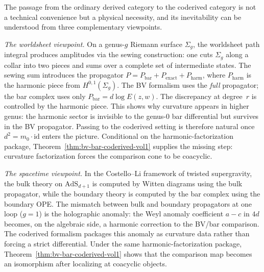 \begin{remark}
\label{rem:bv-bar-coderived-why}
The passage from the ordinary derived category to the coderived
category is not a technical convenience but a physical necessity,
and its inevitability can be understood from three complementary
viewpoints.

\emph{The worldsheet viewpoint.}
On a genus-$g$ Riemann surface $\Sigma_g$, the worldsheet path
integral produces amplitudes via the sewing construction: one cuts
$\Sigma_g$ along a collar into two pieces and sums over a complete
set of intermediate states. The sewing sum introduces the
propagator $P = P_{\mathrm{bar}} + P_{\mathrm{exact}} +
P_{\mathrm{harm}}$, where $P_{\mathrm{harm}}$ is the harmonic
piece from $H^{0,1}(\Sigma_g)$. The BV formalism uses the
\emph{full} propagator; the bar complex uses only
$P_{\mathrm{bar}} = d\log E(z,w)$. The discrepancy at degree~$r$
is controlled by the harmonic piece. This shows why curvature
appears in higher genus: the harmonic sector is invisible to the
genus-$0$ bar differential but survives in the BV propagator.
Passing to the coderived setting is therefore natural once
$d^2 = m_0 \cdot \mathrm{id}$ enters the picture. Conditional on the
harmonic-factorization package, Theorem~\ref{thm:bv-bar-coderived-vol1}
supplies the missing step: curvature factorization forces the
comparison cone to be coacyclic.

\emph{The spacetime viewpoint.}
In the Costello--Li framework of twisted supergravity, the bulk
theory on $\mathrm{AdS}_{d+1}$ is computed by Witten diagrams
using the bulk propagator, while the boundary theory is computed
by the bar complex using the boundary OPE. The mismatch between
bulk and boundary propagators at one loop ($g = 1$) is the
holographic anomaly: the Weyl anomaly coefficient
$a - c$ in $4d$ becomes, on the algebraic side, a harmonic
correction to the BV/bar comparison. The coderived formalism
packages this anomaly as curvature data rather than forcing a
strict differential. Under the same harmonic-factorization package,
Theorem~\ref{thm:bv-bar-coderived-vol1} shows that the comparison map
becomes an isomorphism after localizing at coacyclic objects.


\end{remark}
